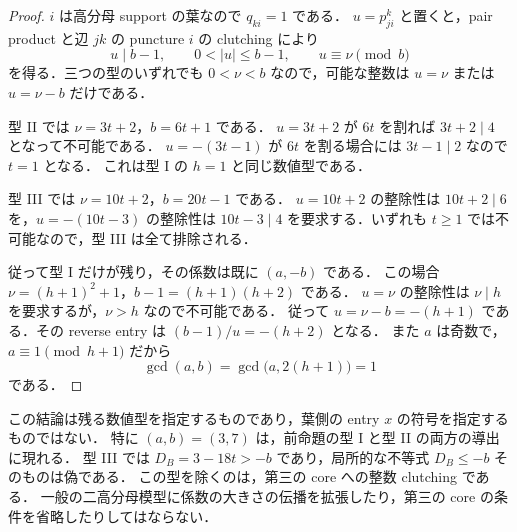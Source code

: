 \begin{proof}
$i$ は高分母 support の葉なので $q_{ki}=1$ である．
$u=p^k_{ji}$ と置くと，pair product と辺 $jk$ の puncture $i$ の clutching により
\begin{equation}\label{lt13:continuation-congruence}
 u\mid b-1,\qquad 0<|u|\leq b-1,\qquad u\equiv\nu\pmod b
\end{equation}
を得る．三つの型のいずれでも $0<\nu<b$ なので，可能な整数は $u=\nu$ または $u=\nu-b$ だけである．

型 II では $\nu=3t+2$，$b=6t+1$ である．
$u=3t+2$ が $6t$ を割れば $3t+2\mid4$ となって不可能である．
$u=-(3t-1)$ が $6t$ を割る場合には $3t-1\mid2$ なので $t=1$ となる．
これは型 I の $h=1$ と同じ数値型である．

型 III では $\nu=10t+2$，$b=20t-1$ である．
$u=10t+2$ の整除性は $10t+2\mid6$ を，$u=-(10t-3)$ の整除性は
$10t-3\mid4$ を要求する．いずれも $t\geq1$ では不可能なので，型 III は全て排除される．

従って型 I だけが残り，その係数は既に $(a,-b)$ である．
この場合 $\nu=(h+1)^2+1$，$b-1=(h+1)(h+2)$ である．
$u=\nu$ の整除性は $\nu\mid h$ を要求するが，$\nu>h$ なので不可能である．
従って $u=\nu-b=-(h+1)$ である．その reverse entry は
$(b-1)/u=-(h+2)$ となる．
また $a$ は奇数で，$a\equiv1\pmod{h+1}$ だから
\[
 \gcd(a,b)=\gcd\bigl(a,2(h+1)\bigr)=1
\]
である．
\end{proof}

この結論は残る数値型を指定するものであり，葉側の entry $x$ の符号を指定するものではない．
特に $(a,b)=(3,7)$ は，前命題の型 I と型 II の両方の導出に現れる．
型 III では $D_B=3-18t>-b$ であり，局所的な不等式 $D_B\leq-b$ そのものは偽である．
この型を除くのは，第三の core への整数 clutching である．
一般の二高分母模型に係数の大きさの伝播を拡張したり，第三の core の条件を省略したりしてはならない．
